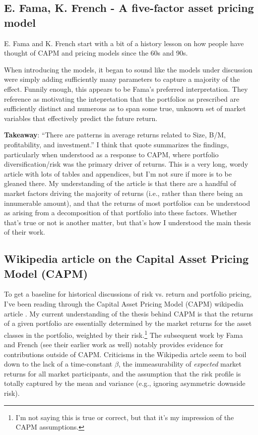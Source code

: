 \subsection{E. Fama, K. French - A five-factor asset pricing model}

E. Fama and K. French start \cite{Fama2015} with a bit of a history lesson on how people have thought of CAPM and pricing models since the 60s and 90s.  

When introducing the models, it began to sound like the models under discussion were simply adding sufficiently many parameters to capture a majority of the effect.  Funnily enough, this appears to be Fama's preferred interpretation.  They reference \cite{Fama1996} as motivating the intepretation that the portfolios as prescribed are sufficiently distinct and numerous as to span some true, unknown set of market variables that effectively predict the future return.

{\bf Takeaway}:  ``There are patterns in average returns related to Size,
B/M, profitability, and investment.'' I think that quote summarizes the findings, particularly when understood as a response to CAPM, where portfolio diversification/risk was the primary driver of returns.  This is a very long, wordy article with lots of tables and appendices, but I'm not sure if more is to be gleaned there.  My understanding of the article is that there are a handful of market factors driving the majority of returns (i.e., rather than there being an innumerable amount), and that the returns of most portfolios can be understood as arising from a decomposition of that portfolio into these factors.  Whether that's true or not is another matter, but that's how I understood the main thesis of their work.


\subsection{Wikipedia article on the Capital Asset Pricing Model (CAPM)}

To get a baseline for historical discussions of risk vs. return and portfolio pricing, I've been reading through the Capital Asset Pricing Model (CAPM) wikipedia article \cite{CAPM2026}.  My current understanding of the thesis behind CAPM is that the returns of a given portfolio are essentially determined by the market returns for the asset classes in the portfolio, weighted by their risk.\footnote{I'm not saying this is true or correct, but that it's my impression of the CAPM assumptions.}  The subsequent work by Fama and French \cite{Fama2015} (see their earlier work as well) notably provides evidence for contributions outside of CAPM.  Criticisms in the Wikipedia artcle seem to boil down to the lack of a time-constant $\beta$, the immeasurability of {\it expected} market returns for all market participants, and the assumption that the risk profile is totally captured by the mean and variance (e.g., ignoring asymmetric downside risk). 

